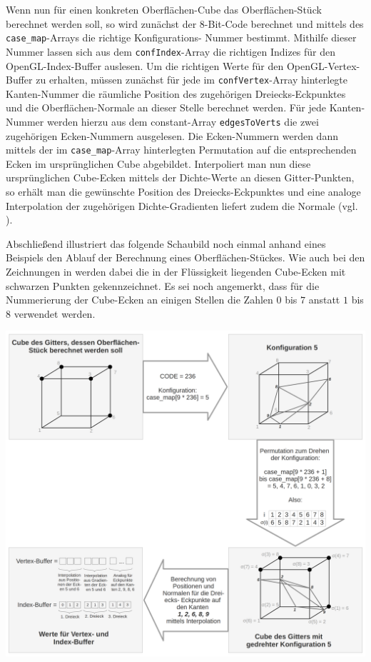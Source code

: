 \noindent Wenn nun für einen konkreten Oberflächen-Cube das Oberflächen-Stück berechnet werden soll, so wird zunächst der $8$-Bit-Code berechnet und mittels des {\tt case\_map}-Arrays die richtige Konfigurations-
Nummer bestimmt. Mithilfe dieser Nummer lassen sich aus dem {\tt confIndex}-Array die richtigen Indizes für den OpenGL-Index-Buffer auslesen. Um die richtigen Werte für den OpenGL-Vertex-Buffer zu erhalten, müssen zunächst für jede im {\tt confVertex}-Array hinterlegte Kanten-Nummer die räumliche Position des zugehörigen Dreiecks-Eckpunktes und die Oberflächen-Normale an dieser Stelle berechnet werden. Für jede Kanten-Nummer werden hierzu aus dem constant-Array {\tt edgesToVerts} die zwei zugehörigen Ecken-Nummern ausgelesen. Die Ecken-Nummern werden dann mittels der im {\tt case\_map}-Array hinterlegten Permutation auf die entsprechenden Ecken im ursprünglichen Cube abgebildet. Interpoliert man nun diese ursprünglichen Cube-Ecken mittels der Dichte-Werte an diesen Gitter-Punkten, so erhält man die gewünschte Position des Dreiecks-Eckpunktes und eine analoge Interpolation der zugehörigen Dichte-Gradienten liefert zudem die Normale (vgl. \cite[S. 165]{MC}).
\smallskip

\noindent Abschließend illustriert das folgende Schaubild noch einmal anhand eines Beispiels den Ablauf der Berechnung eines Oberflächen-Stückes. Wie auch bei den Zeichnungen in \cite[S. 165]{MC} werden dabei die in der Flüssigkeit liegenden Cube-Ecken mit schwarzen Punkten gekennzeichnet. Es sei noch angemerkt, dass für die Nummerierung der Cube-Ecken an einigen Stellen die Zahlen $0$ bis $7$ anstatt $1$ bis $8$ verwendet werden.
\medskip

\begin{center}
\includegraphics[scale=0.2]{images/Cube-Ablauf}
\end{center}
